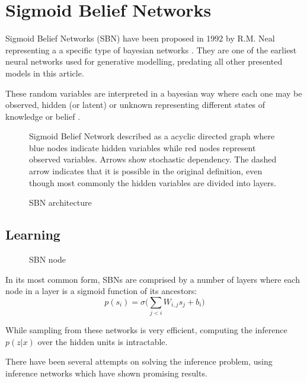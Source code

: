 \section{Sigmoid Belief Networks}
\label{sec:sbn}
Sigmoid Belief Networks (SBN) have been proposed in 1992 by R.M. Neal \cite{neal:1992} representing a a specific type of bayesian networks \cite{pearl:1985}.
They are one of the earliest neural networks used for generative modelling, predating all other presented models in this article.

These random variables are interpreted in a bayesian way where each one may be observed, hidden (or latent) or unknown representing different states of knowledge or belief \cite{definetti:1974}.
\begin{figure}[htb]
\centering

  \caption{SBN architecture}
  \label{fig:sbn_arch}
  \medskip
  \small
  Sigmoid Belief Network described as a acyclic directed graph where blue nodes indicate hidden variables while red nodes represent observed variables.
  Arrows show stochastic dependency. The dashed arrow indicates that it is possible in the original definition, even though most commonly the hidden variables are divided into layers.
\end{figure}

\subsection{Learning}
\begin{figure}[htb]
\centering

  \caption{SBN node}
  \label{fig:sbn_node}
\end{figure}
In its most common form, SBNs are comprised by a number of layers where each node in a layer is a sigmoid function of its ancestors:
$$
p(s_i) = \sigma\bigg(\sum_{j<i}W_{i,j}s_j+b_i\bigg)
$$

While sampling from these networks is very efficient, computing the inference $p(z|x)$ over the hidden units is intractable.

There have been several attempts on solving the inference problem, using inference networks which have shown promising results.


